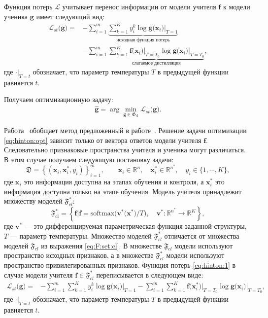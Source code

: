 Функция потерь $\mathcal{L}$ учитывает перенос информации от модели учителя $\mathbf{f}$ к модели ученика $\mathbf{g}$ имеет следующий вид:
\[
\label{eq:hinton:1}
\begin{aligned}
   \mathcal{L}_{st}\bigr(\mathbf{g}\bigr) = &-\sum_{i=1}^{m}\underbrace{{\sum_{k=1}^{K}y^k_i\log\mathbf{g}\bigr(\mathbf{x}_i\bigr)\bigr|_{T=1}}}_{\text{исходная функция потерь}}\\
   &-\sum_{i=1}^{m}\underbrace{{\sum_{k=1}^{K}\mathbf{f}\bigr(\mathbf{x}_i\bigr)\bigr|_{T=T_0}\log\mathbf{g}\bigr(\mathbf{x}_i\bigr)\bigr|_{T=T_0}}}_{\text{слагаемое дистилляция}},
\end{aligned}
\]
где $\cdot\bigr|_{T=t}$ обозначает, что параметр температуры $T$ в предыдущей функции равняется $t$.

Получаем оптимизационную задачу:
\[
\label{eq:hinton:opt}
\begin{aligned}
   \hat{\mathbf{g}} = \arg\min_{\mathbf{g} \in \mathfrak{G}_{\text{cl}}} \mathcal{L}_{st}\bigr(\mathbf{g}\bigr).
\end{aligned}
\]

Работа~\cite{Lopez2016} обобщает метод предложенный в работе~\cite{Hinton2015}. Решение задачи оптимизации \eqref{eq:hinton:opt} зависит только от вектора ответов модели учителя $\mathbf{f}$. Следовательно признаковые пространства учителя и ученика могут различаться. В этом случае получаем следующую постановку задачи:
\[
    \mathfrak{D} = \left\{\left(\mathbf{x}_i, \mathbf{x}^*_i, y_i\right)\right\}_{i=1}^{m}, \qquad \mathbf{x}_i \in \mathbb{R}^{n}, \quad \mathbf{x}^*_i \in \mathbb{R}^{n^*}, \quad y_i \in \{1, \cdots, K\},
\]
где $\mathbf{x}_i$ это информация доступна на этапах обучения и контроля, а $\mathbf{x}^*_i$ это информация доступна только на этапе обучения. Модель учителя принадлежит множеству моделей $\mathfrak{F}_{cl}^*$:
\[
\label{eq:F:set:cl:priv}
\mathfrak{F}_{\text{cl}}^* = \left\{\mathbf{f}| \mathbf{f} = \text{softmax}\bigr(\mathbf{v}^*\bigr(\mathbf{x}^*\bigr)/T\bigr), \quad \mathbf{v}^*: \mathbb{R}^{n^*} \to \mathbb{R}^K \right\},
\]
где $\mathbf{v}^*$ --- это дифференцируемая параметрическая функция заданной структуры, $T$ --- параметр температуры. Множество моделей $\mathfrak{F}_{cl}^*$ отличается от множества моделей $\mathfrak{F}_{cl}$ из выражения \eqref{eq:F:set:cl}. В множестве $\mathfrak{F}_{cl}$ модели используют пространство исходных признаков, а в множестве $\mathfrak{F}_{cl}^*$ модели используют пространство привилегированных признаков. Функция потерь \eqref{eq:hinton:1} в случае модели учителя $\mathbf{f} \in \mathfrak{F}_{cl}^*$ переписывается в следующем виде:
\[
\label{eq:hinton:L:new}
\begin{aligned}
   \mathcal{L}_{st}\bigr(\mathbf{g}\bigr) = &-\sum_{i=1}^{m}{\sum_{k=1}^{K}y^k_i\log\mathbf{g}\bigr(\mathbf{x}_i\bigr)\bigr|_{T=1}}-\sum_{i=1}^{m}{\sum_{k=1}^{K}\mathbf{f}\bigr(\mathbf{x}^*_i\bigr)\bigr|_{T=T_0}\log\mathbf{g}\bigr(\mathbf{x}_i\bigr)\bigr|_{T=T_0}},
\end{aligned}
\]
где $\cdot\bigr|_{T=t}$ обозначает, что параметр температуры $T$ в предыдущей функции равняется $t$.

